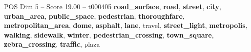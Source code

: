 \begin{textsample}{POS Dim 5 – Score 19.00 – t000405}  \label{ex:f5_pos_013}
\textbf{road\_surface}, \textbf{road}, \textbf{street}, \textbf{city}, \textbf{urban\_area}, \textbf{public\_space}, \textbf{pedestrian}, \textbf{thoroughfare}, \textbf{metropolitan\_area}, \textbf{dome}, \textbf{asphalt}, \textbf{lane}, travel, \textbf{street\_light}, \textbf{metropolis}, \textbf{walking}, \textbf{sidewalk}, \textbf{winter}, \textbf{pedestrian\_crossing}, \textbf{town\_square}, \textbf{zebra\_crossing}, \textbf{traffic}, plaza

\end{textsample}
